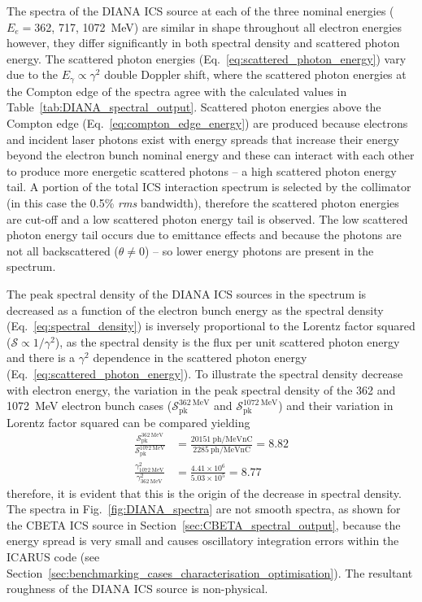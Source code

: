 \documentclass[../main.tex]{subfiles}
\begin{document}
The spectra of the DIANA ICS source at each of the three nominal energies ($E_{e} = $362, 717, 1072~\si{\mega\electronvolt}) are similar in shape throughout all electron energies however, they differ significantly in both spectral density and scattered photon energy. The scattered photon energies (Eq.~\ref{eq:scattered_photon_energy}) vary due to the $E_{\gamma}\propto\gamma^{2}$ double Doppler shift, where the scattered photon energies at the Compton edge of the spectra agree with the calculated values in Table~\ref{tab:DIANA_spectral_output}. Scattered photon energies above the Compton edge (Eq.~\ref{eq:compton_edge_energy}) are produced because electrons and incident laser photons exist with energy spreads that increase their energy beyond the electron bunch nominal energy and these can interact with each other to produce more energetic scattered photons -- a high scattered photon energy tail. A portion of the total ICS interaction spectrum is selected by the collimator (in this case the 0.5\% \textit{rms} bandwidth), therefore the scattered photon energies are cut-off and a low scattered photon energy tail is observed. The low scattered photon energy tail occurs due to emittance effects and because the photons are not all backscattered ($\theta\neq 0$) -- so lower energy photons are present in the spectrum.   

The peak spectral density of the DIANA ICS sources in the spectrum is decreased as a function of the electron bunch energy as the spectral density (Eq.~\ref{eq:spectral_density}) is inversely proportional to the Lorentz factor squared ($\mathcal{S} \propto 1/\gamma^{2}$), as the spectral density is the flux per unit scattered photon energy and there is a $\gamma^{2}$ dependence in the scattered photon energy (Eq.~\ref{eq:scattered_photon_energy}). To illustrate the spectral density decrease with electron energy, the variation in the peak spectral density of the 362 and 1072~\si{\mega\electronvolt} electron bunch cases ($\mathcal{S}_{\mathrm{pk}}^{362~\si{\mega\electronvolt}}$ and $\mathcal{S}_{\mathrm{pk}}^{1072~\si{\mega\electronvolt}}$) and their variation in Lorentz factor squared can be compared yielding
\begin{align}
\frac{\mathcal{S}_{\mathrm{pk}}^{362~\si{\mega\electronvolt}}}{\mathcal{S}_{\mathrm{pk}}^{1072~\si{\mega\electronvolt}}} &= \frac{20151~\mathrm{ph}/\si{\mega\electronvolt\nano\coulomb}} {2285~\mathrm{ph}/\si{\mega\electronvolt\nano\coulomb}} = 8.82 \nonumber\\
\frac{\gamma_{1072~\si{\mega\electronvolt}}^{2}}{\gamma_{362~\si{\mega\electronvolt}}^{2}} &= \frac{4.41\times 10^{6}}{5.03\times 10^{5}} = 8.77 \nonumber
\end{align}
therefore, it is evident that this is the origin of the decrease in spectral density. The spectra in Fig.~\ref{fig:DIANA_spectra} are not smooth spectra, as shown for the CBETA ICS source in Section~\ref{sec:CBETA_spectral_output}, because the energy spread is very small and causes oscillatory integration errors within the \textsc{ICARUS} code (see Section~\ref{sec:benchmarking_cases_characterisation_optimisation}). The resultant roughness of the DIANA ICS source is non-physical.
\end{document}
